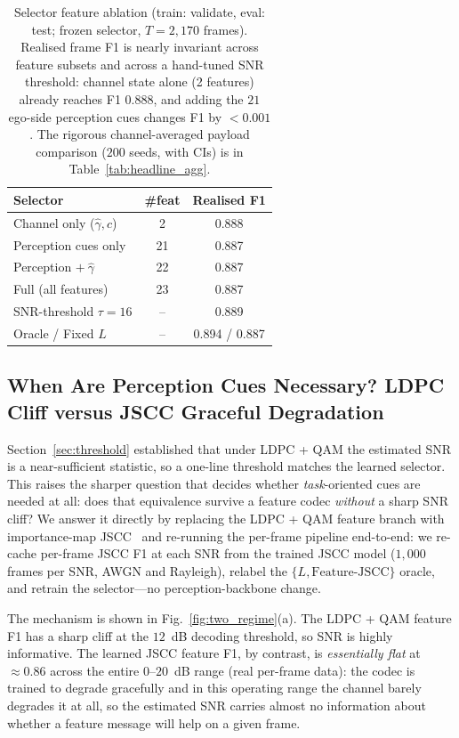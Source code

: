 \documentclass[journal]{IEEEtran}
\begin{document}
\begin{table}[t]
\centering
\caption{Selector feature ablation (train: validate, eval: test; frozen selector,
$T=2{,}170$ frames). Realised frame F1 is nearly invariant across feature subsets and
across a hand-tuned SNR threshold: channel state alone (2 features) already reaches
F1 $0.888$, and adding the $21$ ego-side perception cues changes F1 by $<0.001$. The
rigorous channel-averaged payload comparison ($200$ seeds, with CIs) is in
Table~\ref{tab:headline_agg}.}\label{tab:ablation_threshold}
\begin{tabular}{lcc}
\toprule
Selector & \#feat & Realised F1 \\
\midrule
Channel only ($\hat\gamma,c$)        & 2  & 0.888 \\
Perception cues only                 & 21 & 0.887 \\
Perception $+\ \hat\gamma$           & 22 & 0.887 \\
Full (all features)                  & 23 & 0.887 \\
SNR-threshold $\tau{=}16$            & -- & 0.889 \\
\midrule
Oracle / Fixed $L$                   & -- & 0.894 / 0.887 \\
\bottomrule
\end{tabular}
\end{table}

\subsection{When Are Perception Cues Necessary? LDPC Cliff versus JSCC Graceful Degradation}\label{sec:jscc_aware}

Section~\ref{sec:threshold} established that under LDPC + QAM the estimated SNR is a
near-sufficient statistic, so a one-line threshold matches the learned selector. This
raises the sharper question that decides whether \emph{task}-oriented cues are needed at
all: does that equivalence survive a feature codec \emph{without} a sharp SNR cliff? We
answer it directly by replacing the LDPC + QAM feature branch with importance-map
JSCC~\cite{sheng2024importance} and re-running the per-frame pipeline end-to-end: we
re-cache per-frame JSCC F1 at each SNR from the trained JSCC model ($1{,}000$ frames per
SNR, AWGN and Rayleigh), relabel the $\{L,\text{Feature-JSCC}\}$ oracle, and retrain the
selector---no perception-backbone change.

The mechanism is shown in Fig.~\ref{fig:two_regime}(a). The LDPC + QAM feature F1 has a
sharp cliff at the $12$~dB decoding threshold, so SNR is highly informative. The learned
JSCC feature F1, by contrast, is \emph{essentially flat} at $\approx 0.86$ across the
entire $0$--$20$~dB range (real per-frame data): the codec is trained to degrade
gracefully and in this operating range the channel barely degrades it at all, so the
estimated SNR carries almost no information about whether a feature message will help on
a given frame.
\end{document}

